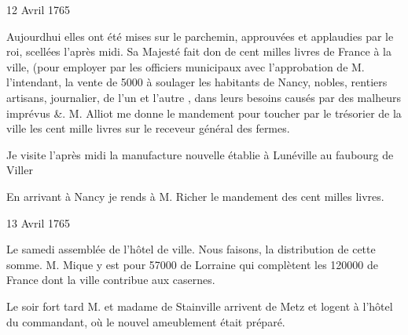                      \begin{diary}{12 Avril 1765}{}
                        
                         Aujourdhui elles ont été mises sur le
                           parchemin, approuvées et applaudies
                           par le roi, scellées
                           l'après midi. Sa Majesté
                           fait don de cent milles livres de France
                           à la ville, (pour employer par les officiers
                           municipaux avec l'approbation de M.
                              l'intendant, la vente de 5000 à soulager
                           les habitants de Nancy, nobles, rentiers
                           artisans, journalier, de l'un et l'autre
                           , dans leurs besoins causés par des
                           malheurs imprévus &. M.
                              Alliot me
                           donne le mandement pour toucher par le
                              trésorier de la ville
                           les cent mille
                              livres
                           sur le receveur général des fermes. \bigskip
        
        
                         Je visite l'après midi la manufacture
                              nouvelle établie à Lunéville au faubourg
                              de Viller
                        \bigskip
        
        
                         En arrivant à Nancy je rends à M.
                              Richer
                           le mandement des cent milles livres. \bigskip
        
        
                     \end{diary}
                     
                     
                     \begin{diary}{13 Avril 1765}{}
                        
                         Le samedi assemblée de l'hôtel de ville. Nous
                           faisons, la distribution de cette somme. M.
                              Mique y est pour 57000\up{#} de Lorraine
                           qui complètent les 120000 de France
                           dont la ville contribue aux casernes. \bigskip
        
        
                         Le soir fort tard M. et madame de Stainville
                           arrivent de Metz et logent à l'hôtel du
                              commandant, où le nouvel ameublement
                           était préparé. \bigskip
        
        
                     \end{diary}


